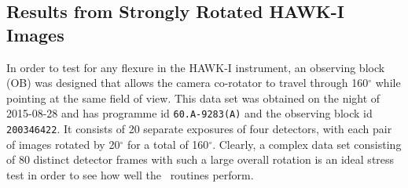 \begin{table}
\begin{center}
\begin{tabular}{|l|l|c|c|c|c|c|c|c|c|c|c|}
\end{tabular}	
\end{center}																											

\label{tab:compare_NGC288}
	\end{table}




  
\subsection{Results from Strongly Rotated HAWK-I Images}
\label{sect:hawki2}

In order to test for any flexure in the HAWK-I instrument, an observing block (OB) was designed that allows the camera co-rotator to
travel through 160$^\circ$ while pointing at the same field of view.   This data set was obtained on the night of 2015-08-28 and has
programme id {\tt 60.A-9283(A)} and the observing block id {\tt 200346422}.  It consists of 20 separate exposures of four detectors, with each
pair of images rotated by 20$^\circ$ for a total of 160$^\circ$.   Clearly, a complex data set consisting of 80 distinct detector frames with such
a large overall rotation is an ideal stress test in order to see how well the \hdrlresample\ routines perform.
 
